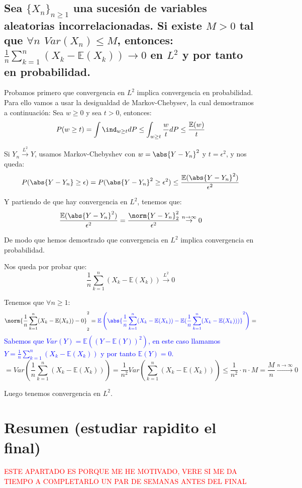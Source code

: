 \documentclass{apuntes}
\begin{document}
\section{Sea $\{X_n\}_{n\geq 1}$ una sucesión de variables aleatorias incorrelacionadas. Si existe $M>0$ tal que $\forall n$ $Var(X_n)\leq M$, entonces: $\frac{1}{n}\sum_{k=1}^{n}(X_k -\mathbb{E}(X_k)) \rightarrow 0$ en $L^2$ y por tanto en probabilidad.}

Probamos primero que convergencia en $L^2$ implica convergencia en probabilidad. Para ello vamos a usar la desigualdad de Markov-Chebysev, la cual demostramos a continuación: Sea $w \geq 0$ y sea $t>0$, entonces: 
\[
P(w \geq t)=\int \ind_{w\geq t} dP \leq \int_{w  \geq t} \frac{w}{t} dP \leq \frac{\mathbb{E}(w)}{t}
\]

Si $Y_n \stackrel{L^2}{\rightarrow} Y$, usamos Markov-Chebyshev con $w=\abs{Y-Y_n}^2$ y $t=\epsilon^2$, y nos queda:
\[
P(\abs{Y-Y_n}\geq \epsilon)=P(\abs{Y-Y_n}^2 \geq \epsilon^2) \leq \frac{\mathbb{E}(\abs{Y-Y_n}^2)}{\epsilon^2}
\]

Y partiendo de que hay convergencia en $L^2$, tenemos que:
\[
\frac{\mathbb{E}(\abs{Y-Y_n}^2)}{\epsilon^2} = \frac{\norm{Y-Y_n}_2^2}{\epsilon^2} \stackrel{n \rightarrow \infty}{\rightarrow} 0 
\]

De modo que hemos demostrado que convergencia en $L^2$ implica convergencia en probabilidad.

Nos queda por probar que:
\[
\frac{1}{n}\sum_{k=1}^{n}(X_k -\mathbb{E}(X_k)) \stackrel{L^2}{\rightarrow} 0
\]

Tenemos que $\forall n \geq 1$:
\[
\norm{\frac{1}{n}\sum_{k=1}^{n}(X_k -\mathbb{E}(X_k)) -0}_2^2 = \textcolor{blue}{\mathbb{E}\left(\abs{\frac{1}{n}\sum_{k=1}^{n}(X_k -\mathbb{E}(X_k))-\mathbb{E}(\frac{1}{n}\sum_{k=1}^{n}(X_k -\mathbb{E}(X_k)))}^2\right)}=
\]
\textcolor{blue}{Sabemos que $Var(Y)= \mathbb{E}((Y-\mathbb{E}(Y))^2)$, en este caso llamamos $Y = \frac{1}{n}\sum_{k=1}^{n}(X_k -\mathbb{E}(X_k))$ y por tanto $\mathbb{E}(Y)=0$.}
\[
= Var\left(\frac{1}{n}\sum_{k=1}^{n}(X_k -\mathbb{E}(X_k))\right) = \frac{1}{n^2}Var\left(\sum_{k=1}^{n}(X_k -\mathbb{E}(X_k))\right) \leq \frac{1}{n^2}\cdot n\cdot M = \frac{M}{n} \stackrel{n \rightarrow \infty}{\rightarrow} 0
\]

Luego tenemos convergencia en $L^2$.




\chapter{Resumen (estudiar rapidito el final)}
\textcolor{red}{ESTE APARTADO ES PORQUE ME HE MOTIVADO, VERE SI ME DA TIEMPO A COMPLETARLO UN PAR DE SEMANAS ANTES DEL FINAL}
\end{document}
